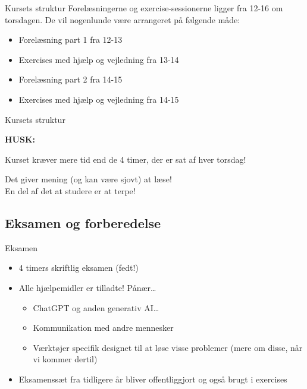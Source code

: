 \documentclass{beamer}
\begin{document}
\begin{frame}{Kursets struktur}
    Forelæsningerne og exercise-sessionerne ligger fra 12-16 om torsdagen. De
    vil nogenlunde være arrangeret på følgende måde:

    \pause

    \begin{itemize}
        \item Forelæsning part 1 fra 12-13
        \item Exercises med hjælp og vejledning fra 13-14
        \item Forelæsning part 2 fra 14-15
        \item Exercises med hjælp og vejledning fra 14-15
    \end{itemize}

\end{frame}

\begin{frame}{Kursets struktur}

    \textbf{HUSK:}

    \medskip
    Kurset \alert{kræver mere tid end de 4 timer}, der er sat af hver
    torsdag!

    \medskip
    Det giver \alert{mening} (og kan være \alert{sjovt}) at \alert{læse}! \\

    \medskip
    En del af det at studere er at \alert{terpe}!
    
\end{frame}

\subsection[Eksamen]{Eksamen og forberedelse}

\begin{frame}{Eksamen}

    \begin{itemize}
        \item 4 timers skriftlig eksamen (fedt!)
            \pause
        \item Alle hjælpemidler er tilladte! \pause \alert{Pånær\ldots}
            \begin{itemize}
                \item ChatGPT og anden generativ AI\ldots
                \item Kommunikation med andre mennesker
                \item Værktøjer specifik designet til at løse visse problemer
                    (mere om disse, når vi kommer dertil)
            \end{itemize}
            \pause
        \item Eksamenssæt fra tidligere år bliver offentliggjort og også brugt i
            exercises
    \end{itemize}
    
\end{frame}
\end{document}
